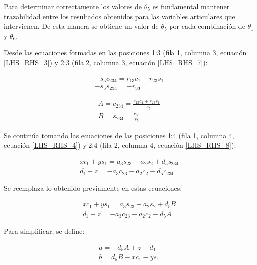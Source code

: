 \documentclass{article}
\begin{document}
Para determinar correctamente los valores de $\theta_5$ es fundamental mantener trazabilidad entre los resultados obtenidos para las variables articulares que intervienen. De esta manera se obtiene un valor de $\theta_5$ por cada combinación de $\theta_1$ y $\theta_6$.

Desde las ecuaciones formadas en las posiciones 1:3 (fila 1, columna 3, ecuación \ref{LHS_RHS_3}) y 2:3 (fila 2, columna 3, ecuación \ref{LHS_RHS_7}):

\begin{equation}
     \begin{gathered}
         -s_5c_{234}=r_{13}c_1+r_{23}s_1\\
         -s_5 s_{234}=-r_{33}
     \end{gathered}
\end{equation}

\begin{equation}
\label{eq:theta_3}
    \begin{gathered}
        A=c_{234}=\frac{r_{13}c_1+r_{23}s_1}{-s_5}\\
        B=s_{234}=\frac{r_{33}}{s_5}
    \end{gathered}
\end{equation}

Se continúa tomando las ecuaciones de las posiciones 1:4 (fila 1, columna 4, ecuación \ref{LHS_RHS_4}) y 2:4 (fila 2, columna 4, ecuación \ref{LHS_RHS_8}):

\begin{equation}
    \begin{gathered}
        xc_1+ys_1=a_3s_{23}+a_2s_2+d_5s_{234}\\
        d_1-z=-a_3c_{23}-a_2c_2-d_5c_{234}
    \end{gathered}
\end{equation}

Se reemplaza lo obtenido previamente en estas ecuaciones:

\begin{equation}
    \begin{gathered}
        xc_1+ys_1=a_3s_{23}+a_2s_2+d_5B\\
        d_1-z=-a_3c_{23}-a_2c_2-d_5A
    \end{gathered}
\end{equation}

Para simplificar, se define:

\begin{equation}
    \begin{gathered}
        a=-d_5A+z-d_1\\
        b=d_5B-xc_1-ys_1
    \end{gathered}
\end{equation}
\end{document}
